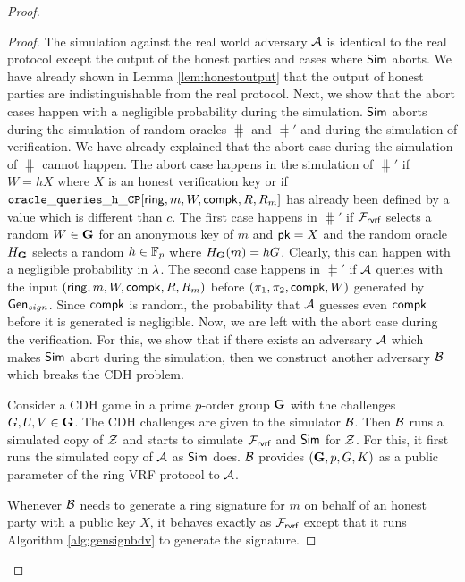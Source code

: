 \begin{proof}
		
		\begin{proof}
			The  simulation against the real world adversary $ \mathcal{A} $ is identical to the real protocol except the output of the honest parties and cases where $ \mathsf{Sim} $ aborts. We have already shown in Lemma \ref{lem:honestoutput} that the output of honest parties are indistinguishable from the real protocol. Next, we show that the abort cases happen with a negligible probability during the simulation. $ \mathsf{Sim} $ aborts during the simulation of random oracles $ \hash $ and $ \hash' $ and during the simulation of verification. We have already explained that the abort case during the simulation of $ \hash $ cannot happen. The abort case happens in the simulation of $ \hash' $ if $ W = hX $ where $ X $ is an honest verification key or if $ \mathtt{oracle\_queries\_h\_CP}[\mathsf{ring},m,W,\mathsf{compk},R,R_m] $ has already been defined by a value which is different than $ c $. The first case happens in $ \hash' $ if $ \mathcal{F}_{\textsf{rvrf}} $ selects a random $ W \in {\mathbf{G}}$ for an anonymous key of $ m $ and $ \mathsf{pk} = X $ and the random oracle $ H_{\mathbf{G}} $ selects a random $ h \in \mathbb{F}_p  $ where $ H_{\mathbf{G}}(m) = hG $. Clearly, this can happen with a negligible probability in $ \lambda $. The 
			second case happens in $ \hash' $ if $ \mathcal{A} $ queries with the input $ (\mathsf{ring},m,W,\mathsf{compk},R,R_m) $ before $ (\pi_1,\pi_2,\mathsf{compk},W) $ generated by $ \mathsf{Gen}_{sign} $. Since $ \mathsf{compk} $ is random, the probability that $ \mathcal{A} $ guesses even $ \mathsf{compk} $ before it is generated is negligible.
			Now, we are left with the abort case during the verification.
			For this, we show that if there exists an adversary $ \mathcal{A} $ which makes $ \mathsf{Sim} $ abort during the simulation, then we construct another adversary $ \mathcal{B} $ which breaks the CDH problem. 
			
			Consider a CDH game in a prime $ p $-order group  $ {\mathbf{G}} $ with the challenges $ G,U, V \in {\mathbf{G}}$. The CDH challenges are given to the simulator $ \mathcal{B} $. Then $ \mathcal{B} $ runs a simulated copy of $ \mathcal{Z} $ and starts to simulate $ \mathcal{F}_{\textsf{rvrf}} $ and $ \mathsf{Sim} $ for $ \mathcal{Z} $. For this, it first runs the simulated copy of $ \mathcal{A} $ as $ \mathsf{Sim} $ does. $ \mathcal{B} $ provides $ ({\mathbf{G}}, p, G , K) $ as a public parameter of the ring VRF protocol to $ \mathcal{A} $.
			
			Whenever $ \mathcal{B} $ needs to generate a ring signature for $ m $ on behalf of an honest party with a public key $ X $, it behaves exactly as $ \mathcal{F}_{\textsf{rvrf}} $ except that it runs   Algorithm \ref{alg:gensignbdv} to generate the signature. 
			

\end{proof}
\end{proof}

